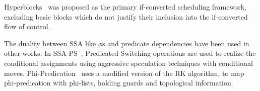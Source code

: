Hyperblocks~\cite{Mahlke:1992:ECS:144965.144998} was proposed as the primary if-converted scheduling framework, excluding basic blocks which do not justify their inclusion into the if-converted flow of control.

The duality between SSA like $\phi$s and predicate dependencies have been used in other works. 
In SSA-PS~\cite{Jacome01clusteredvliw}, Predicated Switching operations are used to realize the conditional assignments using aggressive speculation techniques with conditional moves. 
Phi-Predication~\cite{Chuang03phi-predicationfor} uses a modified version of the RK algorithm, to map phi-predication with phi-lists, holding guards and topological information.












